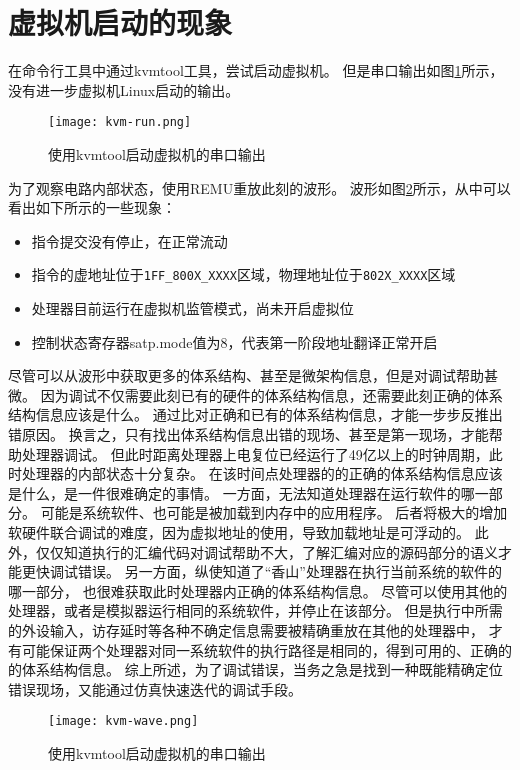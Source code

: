 \section{虚拟机启动的现象}
在命令行工具中通过kvmtool工具，尝试启动虚拟机。
但是串口输出如图\ref{fig:kvm-run}所示，没有进一步虚拟机Linux启动的输出。

\begin{figure}[htbp]
    \centering
    \texttt{[image: kvm-run.png]}
    \caption{使用kvmtool启动虚拟机的串口输出}
    \label{fig:kvm-run}
\end{figure}

为了观察电路内部状态，使用REMU重放此刻的波形。
波形如图\ref{fig:kvm-wave}所示，从中可以看出如下所示的一些现象：
\begin{itemize}
    \item 指令提交没有停止，在正常流动
    \item 指令的虚地址位于\verb|1FF_800X_XXXX|区域，物理地址位于\verb|802X_XXXX|区域
    \item 处理器目前运行在虚拟机监管模式，尚未开启虚拟位
    \item 控制状态寄存器satp.mode值为8，代表第一阶段地址翻译正常开启
\end{itemize}
尽管可以从波形中获取更多的体系结构、甚至是微架构信息，但是对调试帮助甚微。
因为调试不仅需要此刻已有的硬件的体系结构信息，还需要此刻正确的体系结构信息应该是什么。
通过比对正确和已有的体系结构信息，才能一步步反推出错原因。
换言之，只有找出体系结构信息出错的现场、甚至是第一现场，才能帮助处理器调试。
但此时距离处理器上电复位已经运行了49亿以上的时钟周期，此时处理器的内部状态十分复杂。
在该时间点处理器的的正确的体系结构信息应该是什么，是一件很难确定的事情。
一方面，无法知道处理器在运行软件的哪一部分。
可能是系统软件、也可能是被加载到内存中的应用程序。
后者将极大的增加软硬件联合调试的难度，因为虚拟地址的使用，导致加载地址是可浮动的。
此外，仅仅知道执行的汇编代码对调试帮助不大，了解汇编对应的源码部分的语义才能更快调试错误。
另一方面，纵使知道了“香山”处理器在执行当前系统的软件的哪一部分，
也很难获取此时处理器内正确的体系结构信息。
尽管可以使用其他的处理器，或者是模拟器运行相同的系统软件，并停止在该部分。
但是执行中所需的外设输入，访存延时等各种不确定信息需要被精确重放在其他的处理器中，
才有可能保证两个处理器对同一系统软件的执行路径是相同的，得到可用的、正确的的体系结构信息。
综上所述，为了调试错误，当务之急是找到一种既能精确定位错误现场，又能通过仿真快速迭代的调试手段。

\begin{figure}[htbp]
    \centering
    \texttt{[image: kvm-wave.png]}
    \caption{使用kvmtool启动虚拟机的串口输出}
    \label{fig:kvm-wave}
\end{figure}

